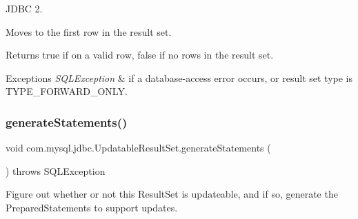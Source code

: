 J\+D\+BC 2.

Moves to the first row in the result set. 

\begin{DoxyReturn}{Returns}
true if on a valid row, false if no rows in the result set.
\end{DoxyReturn}

\begin{DoxyExceptions}{Exceptions}
{\em S\+Q\+L\+Exception} & if a database-\/access error occurs, or result set type is T\+Y\+P\+E\+\_\+\+F\+O\+R\+W\+A\+R\+D\+\_\+\+O\+N\+LY. \\
\hline
\end{DoxyExceptions}
\mbox{\label{classcom_1_1mysql_1_1jdbc_1_1_updatable_result_set_a88b1ef00b296c3cb026dc9c265f137f7}} 
\subsubsection{\texorpdfstring{generate\+Statements()}{generateStatements()}}
{\footnotesize\ttfamily void com.\+mysql.\+jdbc.\+Updatable\+Result\+Set.\+generate\+Statements (\begin{DoxyParamCaption}{ }\end{DoxyParamCaption}) throws S\+Q\+L\+Exception\hspace{0.3cm}{\ttfamily [protected]}}

Figure out whether or not this Result\+Set is updateable, and if so, generate the Prepared\+Statements to support updates.


